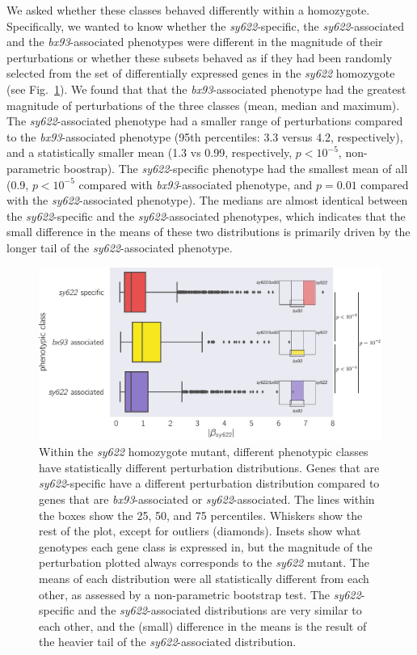 \documentclass[10pt, onecolumn]{article}
\begin{document}
We asked whether these classes behaved differently within a homozygote.
Specifically, we wanted to know whether the \emph{sy622}-specific, the
\emph{sy622}-associated and the \emph{bx93}-associated phenotypes were different
in the magnitude of their perturbations or whether these subsets behaved as if
they had been randomly selected from the set of differentially expressed genes
in the \emph{sy622} homozygote (see Fig.~\ref{fig:classes}). We found that that
the \emph{bx93}-associated phenotype had the greatest magnitude of perturbations
of the three classes (mean, median and maximum). The \emph{sy622}-associated
phenotype had a smaller range of perturbations compared to the
\emph{bx93}-associated phenotype (95th percentiles: 3.3 versus 4.2,
respectively), and a statistically smaller mean (1.3 vs 0.99, respectively, $p <
10^{-5}$, non-parametric boostrap). The \emph{sy622}-specific phenotype had the
smallest mean of all (0.9, $p < 10^{-5}$ compared with \emph{bx93}-associated
phenotype, and $p = 0.01$ compared with the \emph{sy622}-associated phenotype).
The medians are almost identical between the \emph{sy622}-specific and the
\emph{sy622}-associated phenotypes, which indicates that the small difference in the
means of these two distributions is primarily driven by the longer tail of the
\emph{sy622}-associated phenotype.

\begin{figure}
  \centering{}
  \includegraphics[width=\textwidth]{../figs/dpy22_classes.pdf}
  \caption{
    Within the \emph{sy622} homozygote mutant, different phenotypic classes have
    statistically different perturbation distributions. Genes that are
    \emph{sy622}-specific have a different perturbation distribution compared to
    genes that are \emph{bx93}-associated or \emph{sy622}-associated. The lines
    within the boxes show the 25, 50, and 75 percentiles. Whiskers show the rest
    of the plot, except for outliers (diamonds). Insets show what genotypes each
    gene class is expressed in, but the magnitude of the perturbation plotted
    always corresponds to the \emph{sy622} mutant. The means of each
    distribution were all statistically different from each other, as assessed
    by a non-parametric bootstrap test. The \emph{sy622}-specific and the
    \emph{sy622}-associated distributions are very similar to each other, and
    the (small) difference in the means is the result of the heavier tail of the
    \emph{sy622}-associated distribution.
  }
\label{fig:classes}
\end{figure}
\end{document}
